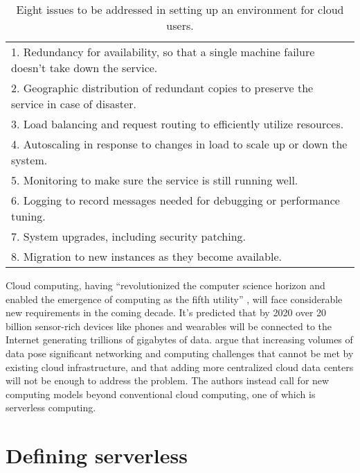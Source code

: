 \begin{table}[h!]
\centering
\begin{tabular}{|l|}
\hline
1. Redundancy for availability, so that a single machine failure doesn’t take down the service. \\
2. Geographic distribution of redundant copies to preserve the service in case of disaster. \\
3. Load balancing and request routing to efficiently utilize resources. \\
4. Autoscaling in response to changes in load to scale up or down the system. \\
5. Monitoring to make sure the service is still running well. \\
6. Logging to record messages needed for debugging or performance tuning. \\
7. System upgrades, including security patching. \\
8. Migration to new instances as they become available. \\
\hline
\end{tabular}
\caption{Eight issues to be addressed in setting up an environment for cloud users. \parencite{jonas19berkeleyView}}
\label{table:cloudIssues}
\end{table}

Cloud computing, having ``revolutionized the computer science horizon and enabled the emergence of computing as the fifth utility'' \parencite{buyya2017manifesto}, will face considerable new requirements in the coming decade. It's predicted that by 2020 over 20 billion sensor-rich devices like phones and wearables will be connected to the Internet generating trillions of gigabytes of data. \textcite{varghese18next} argue that increasing volumes of data pose significant networking and computing challenges that cannot be met by existing cloud infrastructure, and that adding more centralized cloud data centers will not be enough to address the problem. The authors instead call for new computing models beyond conventional cloud computing, one of which is serverless computing.

\section{Defining serverless} \label{sec:definingServerless}

